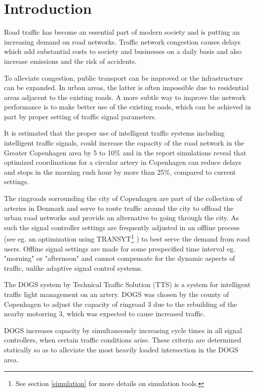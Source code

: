 \section{Introduction}

Road traffic has become an essential part of modern society and is putting an increasing
demand on road networks.
Traffic network congestion causes delays which add substantial costs
to society and businesses on a daily basis and also increase emissions
and the risk of accidents.

To alleviate congestion, public transport can be improved or the
infrastructure can be expanded. In urban areas, the latter is often
impossible due to residential areas adjacent to the existing roads.  A
more subtle way to improve the network performance is to make better
use of the existing roads, which can be achieved in part by proper
setting of traffic signal parameters.

It is estimated that the proper use of intelligent traffic systems
including intelligent traffic signals, could increase the capacity of the
road network in the Greater Copenhagen area by 5 to 10\% and in the report \cite{bedresignaler} simulations reveal that optimized coordinations for a circular artery in Copenhagen can reduce delays and stops in the morning rush hour by more than 25\%, compared to current settings.

The ringroads sorrounding the city of Copenhagen are part of the collection of arteries in Denmark and serve to route traffic around the city to offload the urban road networks and provide an alternative to going through the city. As such the signal controller settings are frequently adjusted in an offline process (see eg. an optimization using TRANSYT\footnote{See section \ref{simulation} for more details on simulation	tools.} \cite{transyt}) to best serve the demand from road users. Offline signal settings are made for some prespecified time interval eg. "morning" or "afternoon" and cannot compensate for the dynamic aspects of traffic, unlike adaptive signal control systems.

The DOGS system by Technical Traffic Solution (TTS) is a system for intelligent traffic light management on an artery. DOGS was chosen by the county of Copenhagen to adjust the capacity of ringroad 3 due to the rebuilding of the nearby motorring 3, which was expected to cause increased traffic.

DOGS increases capacity by simultaneously increasing cycle times in all signal controllers, when certain traffic conditions arise. These criteria are determined statically so as to alleviate the most heavily loaded intersection in the DOGS area.

